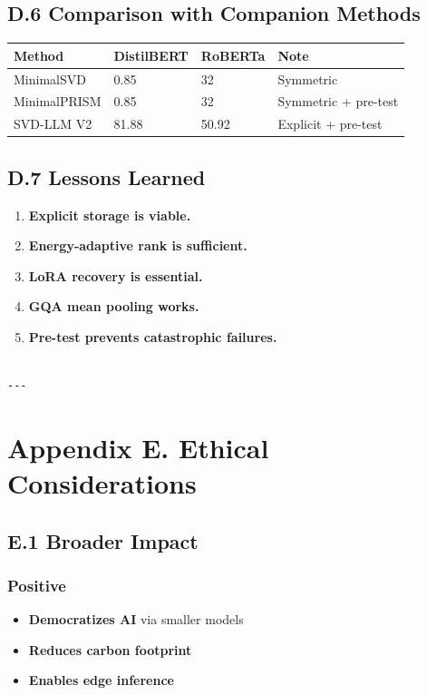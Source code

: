 \subsection{D.6 Comparison with Companion Methods}

\begin{table}[H]
\centering
\small
\begin{tabular}{llll}
\toprule
\textbf{Method} & \textbf{DistilBERT} & \textbf{RoBERTa} & \textbf{Note} \\
\midrule
MinimalSVD & 0.85 & 32 & Symmetric \\
MinimalPRISM & 0.85 & 32 & Symmetric + pre-test \\
SVD-LLM V2 & 81.88 & 50.92 & Explicit + pre-test \\
\bottomrule
\end{tabular}
\end{table}

\subsection{D.7 Lessons Learned}

\begin{enumerate}
\item \textbf{Explicit storage is viable.}
\item \textbf{Energy-adaptive rank is sufficient.}
\item \textbf{LoRA recovery is essential.}
\item \textbf{GQA mean pooling works.}
\item \textbf{Pre-test prevents catastrophic failures.}
\end{enumerate}
\begin{lstlisting}

---
\end{lstlisting}


\section{Appendix E. Ethical Considerations}

\subsection{E.1 Broader Impact}

\subsubsection{Positive}
\begin{itemize}
\item \textbf{Democratizes AI} via smaller models
\item \textbf{Reduces carbon footprint}
\item \textbf{Enables edge inference}

\end{itemize}
